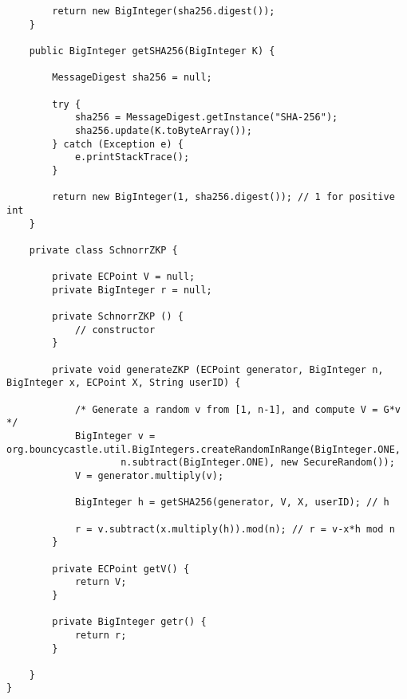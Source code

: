 \documentclass[../PFC.tex]{subfiles}
\begin{document}
\begin{lstlisting}
    	return new BigInteger(sha256.digest());
    }

    public BigInteger getSHA256(BigInteger K) {

    	MessageDigest sha256 = null;

    	try {
    		sha256 = MessageDigest.getInstance("SHA-256");
    		sha256.update(K.toByteArray());
    	} catch (Exception e) {
    		e.printStackTrace();
    	}

    	return new BigInteger(1, sha256.digest()); // 1 for positive int
    }
    
    private class SchnorrZKP {
    	
    	private ECPoint V = null;
    	private BigInteger r = null;
    			
    	private SchnorrZKP () {
    		// constructor
    	}
    	
    	private void generateZKP (ECPoint generator, BigInteger n, BigInteger x, ECPoint X, String userID) {

        	/* Generate a random v from [1, n-1], and compute V = G*v */
        	BigInteger v = org.bouncycastle.util.BigIntegers.createRandomInRange(BigInteger.ONE, 
        			n.subtract(BigInteger.ONE), new SecureRandom());
        	V = generator.multiply(v);
        	
        	BigInteger h = getSHA256(generator, V, X, userID); // h

        	r = v.subtract(x.multiply(h)).mod(n); // r = v-x*h mod n   	
        }
    	
    	private ECPoint getV() {
    		return V;
    	}
    	
    	private BigInteger getr() {
    		return r;
    	}
    	
    }
}
\end{lstlisting}
\end{document}
